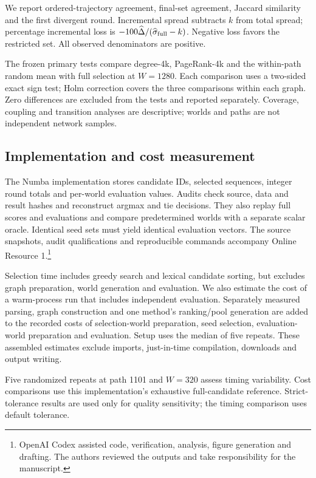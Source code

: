 \documentclass[smallextended]{svjour3}
\begin{document}
We report ordered-trajectory agreement, final-set agreement, Jaccard similarity and the first divergent round. Incremental spread subtracts $k$ from total spread; percentage incremental loss is $-100\widehat\Delta/(\widehat\sigma_{\rm full}-k)$. Negative loss favors the restricted set. All observed denominators are positive.

The frozen primary tests compare degree-4k, PageRank-4k and the within-path random mean with full selection at $W=1280$. Each comparison uses a two-sided exact sign test; Holm correction covers the three comparisons within each graph. Zero differences are excluded from the tests and reported separately. Coverage, coupling and transition analyses are descriptive; worlds and paths are not independent network samples.

\subsection{Implementation and cost measurement}
The Numba implementation stores candidate IDs, selected sequences, integer round totals and per-world evaluation values. Audits check source, data and result hashes and reconstruct argmax and tie decisions. They also replay full scores and evaluations and compare predetermined worlds with a separate scalar oracle. Identical seed sets must yield identical evaluation vectors. The source snapshots, audit qualifications and reproducible commands accompany Online Resource 1.\footnote{OpenAI Codex assisted code, verification, analysis, figure generation and drafting. The authors reviewed the outputs and take responsibility for the manuscript.}

Selection time includes greedy search and lexical candidate sorting, but excludes graph preparation, world generation and evaluation. We also estimate the cost of a warm-process run that includes independent evaluation. Separately measured parsing, graph construction and one method's ranking/pool generation are added to the recorded costs of selection-world preparation, seed selection, evaluation-world preparation and evaluation. Setup uses the median of five repeats. These assembled estimates exclude imports, just-in-time compilation, downloads and output writing.

Five randomized repeats at path 1101 and $W=320$ assess timing variability. Cost comparisons use this implementation's exhaustive full-candidate reference. Strict-tolerance results are used only for quality sensitivity; the timing comparison uses default tolerance.
\end{document}
